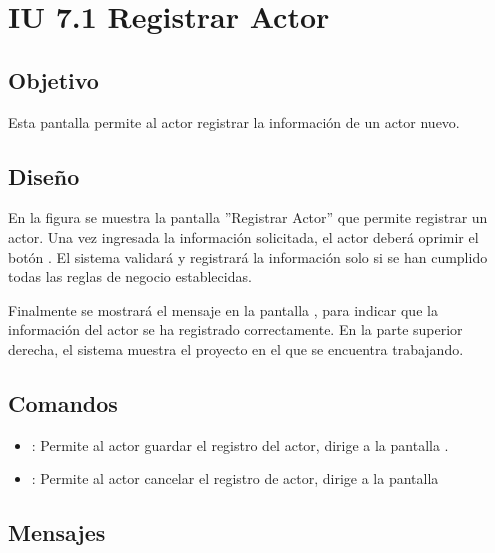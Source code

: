 \section{IU 7.1 Registrar Actor}

\subsection{Objetivo}
	Esta pantalla permite al actor registrar la información de un actor nuevo.
\subsection{Diseño}
	En la figura  se muestra la pantalla ''Registrar Actor'' que permite registrar un actor.
	Una vez ingresada la información solicitada, el actor deberá oprimir el botón  . El sistema validará y registrará la información solo si se han cumplido todas las reglas de negocio establecidas.
	
	Finalmente se mostrará el mensaje  en la pantalla , para indicar que la información del actor se ha registrado correctamente.
	En la parte superior derecha, el sistema muestra el proyecto en el que se encuentra trabajando.

\subsection{Comandos}
\begin{itemize}
	\item {}: Permite al actor guardar el registro del actor, dirige a la pantalla .
	\item {}: Permite al actor cancelar el registro de actor, dirige a la pantalla 
\end{itemize}

\subsection{Mensajes}

